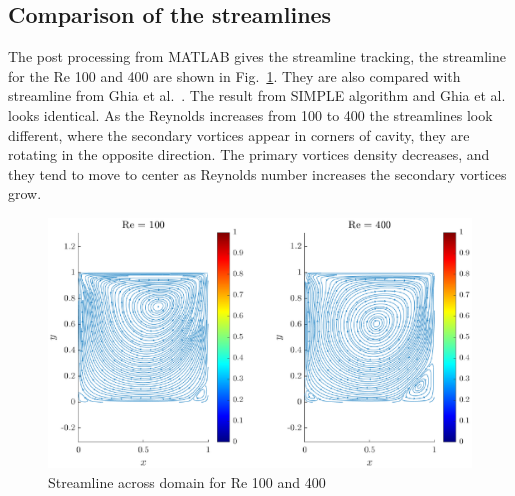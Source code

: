 \documentclass{article}
\numberwithin{equation}{section}
\numberwithin{figure}{section}
\begin{document}
\subsection{Comparison of the streamlines}
The post processing from MATLAB gives the streamline tracking, the streamline for the Re 100 and 400 are shown in Fig.~\ref{fig:streamline}. They are also compared with streamline from Ghia et al.~\cite{ghia1982high}. The result from SIMPLE algorithm and Ghia et al. looks identical. As the Reynolds increases from 100 to 400 the streamlines look different, where the secondary vortices appear in corners of cavity, they are rotating in the opposite direction. The primary vortices density decreases, and they tend to move to center as Reynolds number increases the secondary vortices grow.

\begin{figure}
    \centering
    \includegraphics[trim=60 0 60 0, clip]{streamline.eps}
    \caption{Streamline across domain for Re 100 and 400}
    \label{fig:streamline}
\end{figure}
\end{document}
